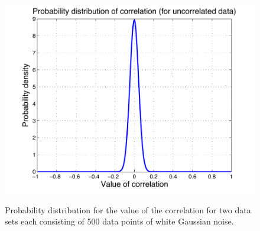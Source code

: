 \documentclass[prd,floatfix,preprintnumbers,amsmath,amssymb,nofootinbib,superscriptaddress]{revtex4}
\begin{document}
\begin{figure}[h]
\includegraphics[width=17cm]{pdf}\\
\caption{Probability distribution for the value of the correlation for two data sets each 
consisting of 500 data points of white Gaussian noise.}
\end{figure}
\end{document}
